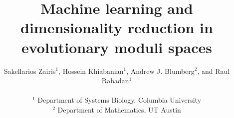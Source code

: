 \documentclass[a4paper,11pt]{article}
\begin{document}
\title{Machine learning and dimensionality reduction in evolutionary moduli spaces}

\author{Sakellarios Zairis$^1$, Hossein Khiabanian$^1$, Andrew J. Blumberg$^2$, and Raul Rabadan$^1$\\
\\
$^1$ Department of Systems Biology, Columbia University\\
$^2$ Department of Mathematics, UT Austin\\}
\maketitle


\end{document}
